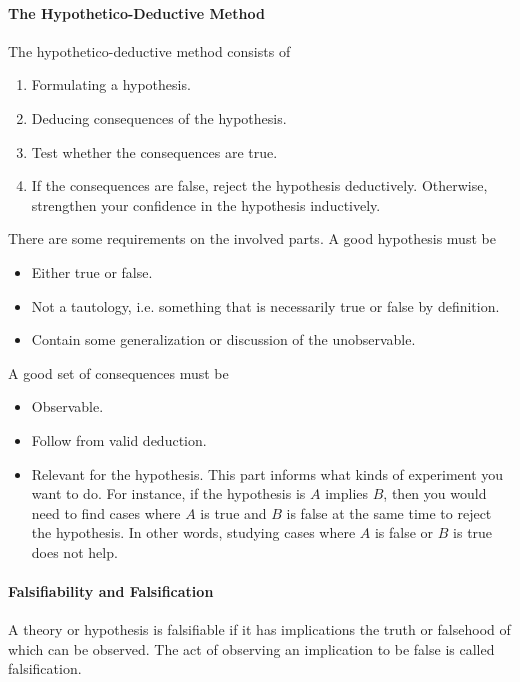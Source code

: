 \paragraph{The Hypothetico-Deductive Method}
The hypothetico-deductive method consists of
\begin{enumerate}
	\item Formulating a hypothesis.
	\item Deducing consequences of the hypothesis.
	\item Test whether the consequences are true.
	\item If the consequences are false, reject the hypothesis deductively. Otherwise, strengthen your confidence in the hypothesis inductively.
\end{enumerate}

There are some requirements on the involved parts. A good hypothesis must be
\begin{itemize}
	\item Either true or false.
	\item Not a tautology, i.e. something that is necessarily true or false by definition.
	\item Contain some generalization or discussion of the unobservable.
\end{itemize}

A good set of consequences must be
\begin{itemize}
	\item Observable.
	\item Follow from valid deduction.
	\item Relevant for the hypothesis. This part informs what kinds of experiment you want to do. For instance, if the hypothesis is $A$ implies $B$, then you would need to find cases where $A$ is true and $B$ is false at the same time to reject the hypothesis. In other words, studying cases where $A$ is false or $B$ is true does not help.
\end{itemize}

\paragraph{Falsifiability and Falsification}
A theory or hypothesis is falsifiable if it has implications the truth or falsehood of which can be observed. The act of observing an implication to be false is called falsification.

